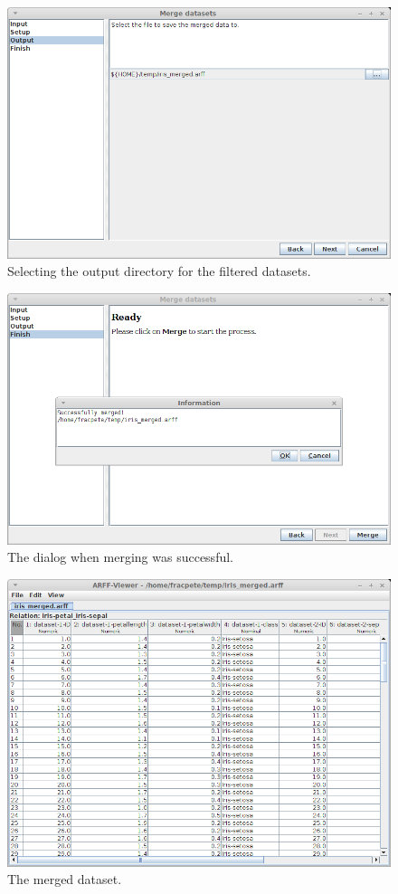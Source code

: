 \begin{figure}[htb]
  \centering
  \includegraphics[width=12.0cm]{images/merge_datasets3.png}
  \caption{Selecting the output directory for the filtered datasets.}
  \label{merge_datasets3}
\end{figure}

\begin{figure}[htb]
  \centering
  \includegraphics[width=12.0cm]{images/merge_datasets4.png}
  \caption{The dialog when merging was successful.}
  \label{merge_datasets4}
\end{figure}

\begin{figure}[htb]
  \centering
  \includegraphics[width=12.0cm]{images/merge_datasets-output.png}
  \caption{The merged dataset.}
  \label{merge_datasets-output}
\end{figure}

